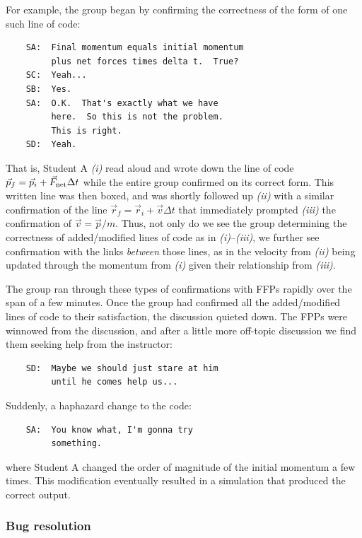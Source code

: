 \documentclass{msuphddissertation}
\begin{document}
\begin{doublespace}
For example, the group began by confirming the correctness of the form of one such line of code:  \begin{verbatim}
    SA:  Final momentum equals initial momentum
         plus net forces times delta t.  True?
    SC:  Yeah...
    SB:  Yes.
    SA:  O.K.  That's exactly what we have
         here.  So this is not the problem.
         This is right.
    SD:  Yeah.
\end{verbatim}  That is, Student A \emph{(i)} read aloud and wrote down the line of code $\vec{p}_{f}=\vec{p}_{i}+\vec{F}_{\rm net}\Delta t$ while the entire group confirmed on its correct form.  This written line was then boxed, and was shortly followed up \emph{(ii)} with a similar confirmation of the line $\vec{r}_{f}=\vec{r}_{i}+\vec{v}\Delta t$ that immediately prompted \emph{(iii)} the confirmation of $\vec{v}=\vec{p}/m$.  Thus, not only do we see the group determining the correctness of added/modified lines of code as in \emph{(i)}--\emph{(iii)}, we further see confirmation with the links \emph{between} those lines, as in the velocity from \emph{(ii)} being updated through the momentum from \emph{(i)} given their relationship from \emph{(iii)}.

The group ran through these types of confirmations with FFPs rapidly over the span of a few minutes.  Once the group had confirmed all the added/modified lines of code to their satisfaction, the discussion quieted down.  The FPPs were winnowed from the discussion, and after a little more off-topic discussion we find them seeking help from the instructor:  \begin{verbatim}
    SD:  Maybe we should just stare at him
         until he comes help us...
\end{verbatim} Suddenly, a haphazard change to the code:  \begin{verbatim}
    SA:  You know what, I'm gonna try
         something.
\end{verbatim} where Student A changed the order of magnitude of the initial momentum a few times.  This modification eventually resulted in a simulation that produced the correct output.

\subsubsection{Bug resolution}


\end{doublespace}
\end{document}
